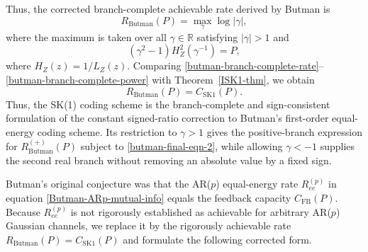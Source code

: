 \documentclass[12pt]{article}
\begin{document}
Thus, the corrected branch-complete achievable rate derived by Butman is
\begin{equation}\label{butman-branch-complete-rate}
R_{\mathrm{Butman}}(P) = \max_\gamma\log |\gamma|,
\end{equation}
where the maximum is taken over all $\gamma\in\mathbb{R}$ satisfying $|\gamma|>1$ and 
\begin{equation}\label{butman-branch-complete-power}
   (\gamma^2-1)H_Z^2(\gamma^{-1})=P,
\end{equation}
where \(H_Z(z)=1/L_Z(z)\). Comparing \eqref{butman-branch-complete-rate}--\eqref{butman-branch-complete-power} with Theorem~\ref{ISK1-thm}, we obtain
\begin{equation}\label{butman-sk1-identity}
    R_{\mathrm{Butman}}(P)=C_{\mathrm{SK1}}(P).
\end{equation}
Thus, the SK(1) coding scheme is the branch-complete and sign-consistent formulation of the constant signed-ratio correction to Butman's first-order equal-energy coding scheme. Its restriction to $\gamma>1$ gives the positive-branch expression for $R^{(+)}_{\mathrm{Butman}}(P)$ subject to \eqref{butman-final-eqn-2}, while allowing $\gamma<-1$ supplies the second real branch without removing an absolute value by a fixed sign.

Butman's original conjecture was that the AR($p$) equal-energy rate $R^{(p)}_{ee}$ in equation \eqref{Butman-ARp-mutual-info} equals the feedback capacity $C_\mathrm{FB}(P)$. Because $R^{(p)}_{ee}$ is not rigorously established as achievable for arbitrary AR($p$) Gaussian channels, we replace it by the rigorously achievable rate $R_{\mathrm{Butman}}(P)=C_{\mathrm{SK1}}(P)$ and formulate the following corrected form.

\end{document}
